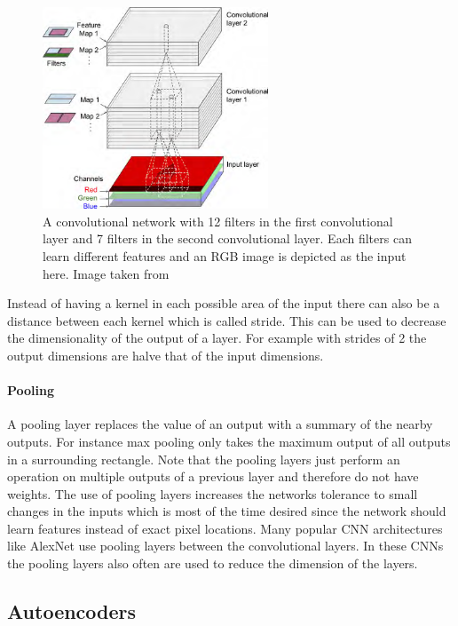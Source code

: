 \begin{figure}[h]
    \centering
    \includegraphics[width=0.6\textwidth]{images/figures/convolutional_net_multiple_filters.png}
    \caption{A convolutional network with 12 filters in the first convolutional layer and 7
    filters in the second convolutional layer. Each filters can learn different features and an
    RGB image is depicted as the input here.
    Image taken from \parencite{2017-geron-homl}} \label{figure_cnn_filter}
\end{figure}

Instead of having a kernel in each possible area of the input there can also be a distance between
each kernel which is called stride. This can be used to decrease the dimensionality of the output
of a layer. For example with strides of 2 the output dimensions are halve that of the input
dimensions.

\paragraph{Pooling}
A pooling layer replaces the value of an output with a summary of the nearby outputs. For instance
max pooling only takes the maximum output of all outputs in a surrounding rectangle. Note that
the pooling layers just perform an operation on multiple outputs of a previous layer and therefore
do not have weights. The use of pooling layers increases the networks tolerance to small changes in
the inputs \parencite{2016-goodfellow-deep} which is most of the time desired since the network should
learn features instead of exact pixel locations. Many popular CNN architectures like 
AlexNet \parencite{2012-krizhevsky-imagenet} use pooling layers between the convolutional layers.
In these CNNs the pooling layers also often are used to reduce the dimension of the layers.


\subsection{Autoencoders}

